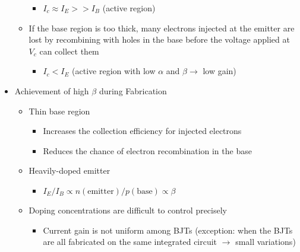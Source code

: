 \begin{itemize}
\begin{itemize}
\begin{itemize}
          \item $I_c\approx I_E >> I_B$ (active region)

        \end{itemize}

      \item If the base region is too thick, many electrons injected at the emitter are lost by recombining with holes in the base before the voltage applied at $V_c$ can collect them

        \begin{itemize}

          \item $I_c<I_E$ (active region with low $\alpha$ and $\beta\to$ low gain)

        \end{itemize}

    \end{itemize}

  \item Achievement of high $\beta$ during Fabrication

    \begin{itemize}

      \item Thin base region

        \begin{itemize}

          \item Increases the collection efficiency for injected electrons

          \item Reduces the chance of electron recombination in the base

        \end{itemize}

      \item Heavily-doped emitter

        \begin{itemize}

          \item $I_E/I_B\propto n (\text{emitter})/ p (\text{base})\propto \beta$

        \end{itemize}

      \item Doping concentrations are difficult to control precisely

        \begin{itemize}

          \item Current gain is not uniform among BJTs (exception: when the BJTs are all fabricated on the same integrated circuit $\to$ small variations)


\end{itemize}
\end{itemize}
\end{itemize}
